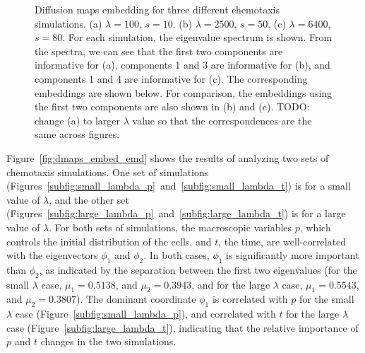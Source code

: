 \documentclass[preprint]{elsarticle}
\begin{document}
\begin{figure}
\begin{subfigure}[t]{0.35\textwidth}
\caption{}
\end{subfigure}
%
\caption{Diffusion maps embedding for three different chemotaxis simulations. (a) $\lambda = 100$, $s = 10$. (b) $\lambda = 2500$, $s = 50$. (c) $\lambda = 6400$, $s = 80$. For each simulation, the eigenvalue spectrum is shown. From the spectra, we can see that the first two components are informative for (a), components 1 and 3 are informative for (b), and components 1 and 4 are informative for (c). The corresponding embeddings are shown below. For comparison, the embeddings using the first two components are also shown in (b) and (c). TODO: change (a) to larger $\lambda$ value so that the correspondences are the same across figures.}
%
\label{fig:chemotaxis_simulations_harmonics}
\end{figure}


Figure~\ref{fig:dmaps_embed_emd} shows the results of analyzing two sets of chemotaxis simulations. 
%
One set of simulations (Figures~\ref{subfig:small_lambda_p}~and~\ref{subfig:small_lambda_t}) is for a small value of $\lambda$, and the other set (Figures~\ref{subfig:large_lambda_p}~and~\ref{subfig:large_lambda_t}) is for a large value of $\lambda$. 
%
For both sets of simulations, the macroscopic variables $p$, which controls the initial distribution of the cells, and $t$, the time, are well-correlated with the eigenvectors $\phi_1$ and $\phi_2$. 
%
In both cases, $\phi_1$ is significantly more important than $\phi_2$, as indicated by the separation between the first two eigenvalues (for the small $\lambda$ case, $\mu_1 = 0.5138$, and $\mu_2 = 0.3943$, and for the large $\lambda$ case, $\mu_1 = 0.5543$, and $\mu_2 = 0.3807$).
%
The dominant coordinate $\phi_1$ is correlated with $p$ for the small $\lambda$ case (Figure~\ref{subfig:small_lambda_p}), and correlated with $t$ for the large $\lambda$ case (Figure~\ref{subfig:large_lambda_t}), indicating that the relative importance of $p$ and $t$ changes in the two simulations.
%
\end{document}
